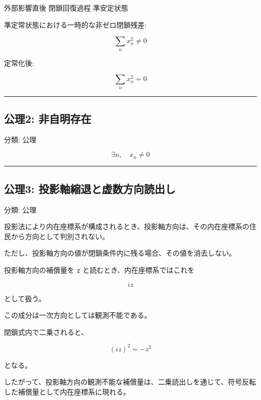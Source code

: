 \documentclass[
  a4paper,
]{ltjsarticle}
\newenvironment{Shaded}{}{}
\newcommand{\NormalTok}[1]{#1}
\begin{document}
\begin{Shaded}
\begin{Highlighting}[]
\NormalTok{外部影響直後}
\NormalTok{閉鎖回復過程}
\NormalTok{準安定状態}
\end{Highlighting}
\end{Shaded}

準定常状態における一時的な非ゼロ閉鎖残差:

\[
\sum_n x_n^2\ne0
\]

定常化後:

\[
\sum_n x_n^2=0
\]

\begin{center}\rule{0.5\linewidth}{0.5pt}\end{center}

\subsection{公理2:
非自明存在}\label{ux516cux74062-ux975eux81eaux660eux5b58ux5728}

分類: 公理

\[
\exists n,\quad x_n\neq0
\]

\begin{center}\rule{0.5\linewidth}{0.5pt}\end{center}

\subsection{公理3:
投影軸縮退と虚数方向読出し}\label{ux516cux74063-ux6295ux5f71ux8ef8ux7e2eux9000ux3068ux865aux6570ux65b9ux5411ux8aadux51faux3057}

分類: 公理

投影法により内在座標系が構成されるとき、投影軸方向は、その内在座標系の住民から方向として判別されない。

ただし、投影軸方向の値が閉鎖条件内に残る場合、その値を消去しない。

投影軸方向の補償量を \texttt{z} と読むとき、内在座標系ではこれを

\[
iz
\]

として扱う。

この成分は一次方向としては観測不能である。

閉鎖式内で二乗されると、

\[
(iz)^2=-z^2
\]

となる。

したがって、投影軸方向の観測不能な補償量は、二乗読出しを通じて、符号反転した補償量として内在座標系に現れる。
\end{document}
